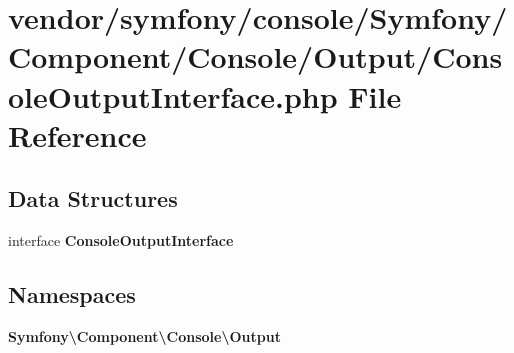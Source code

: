 \section{vendor/symfony/console/\+Symfony/\+Component/\+Console/\+Output/\+Console\+Output\+Interface.php File Reference}
\label{_console_output_interface_8php}
\subsection*{Data Structures}
\begin{DoxyCompactItemize}
\item 
interface {\bf Console\+Output\+Interface}
\end{DoxyCompactItemize}
\subsection*{Namespaces}
\begin{DoxyCompactItemize}
\item 
 {\bf Symfony\textbackslash{}\+Component\textbackslash{}\+Console\textbackslash{}\+Output}
\end{DoxyCompactItemize}
